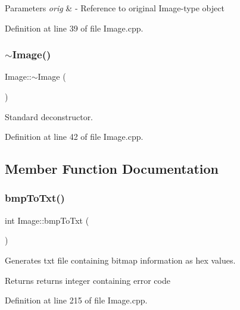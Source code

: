 \begin{DoxyParams}{Parameters}
{\em orig} & -\/ Reference to original Image-\/type object \\
\hline
\end{DoxyParams}


Definition at line 39 of file Image.\+cpp.

\mbox{\label{classImage_a0294f63700543e11c0f0da85601c7ae5}} 
\subsubsection{\texorpdfstring{$\sim$Image()}{~Image()}}
{\footnotesize\ttfamily Image\+::$\sim$\+Image (\begin{DoxyParamCaption}{ }\end{DoxyParamCaption})\hspace{0.3cm}{\ttfamily [virtual]}}

Standard deconstructor. 

Definition at line 42 of file Image.\+cpp.



\subsection{Member Function Documentation}
\mbox{\label{classImage_aa16c9acd068079c676dec4186262b1b7}} 
\subsubsection{\texorpdfstring{bmpToTxt()}{bmpToTxt()}}
{\footnotesize\ttfamily int Image\+::bmp\+To\+Txt (\begin{DoxyParamCaption}{ }\end{DoxyParamCaption})}



Generates txt file containing bitmap information as hex values. 

\begin{DoxyReturn}{Returns}
returns integer containing error code 
\end{DoxyReturn}


Definition at line 215 of file Image.\+cpp.

